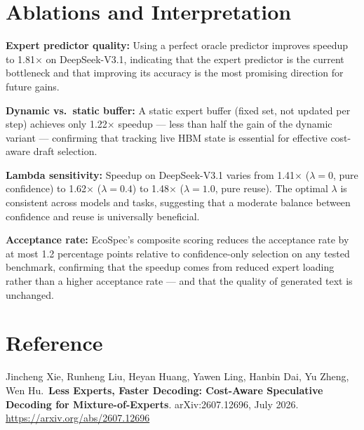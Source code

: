 \documentclass[10pt,twocolumn]{article}
\begin{document}
\section{Ablations and Interpretation}

\textbf{Expert predictor quality:} Using a perfect oracle predictor
improves speedup to 1.81$\times$ on DeepSeek-V3.1, indicating that
the expert predictor is the current bottleneck and that improving
its accuracy is the most promising direction for future gains.

\textbf{Dynamic vs.\ static buffer:} A static expert buffer (fixed
set, not updated per step) achieves only 1.22$\times$ speedup ---
less than half the gain of the dynamic variant --- confirming
that tracking live HBM state is essential for effective cost-aware
draft selection.

\textbf{Lambda sensitivity:} Speedup on DeepSeek-V3.1 varies from
1.41$\times$ ($\lambda = 0$, pure confidence) to 1.62$\times$
($\lambda = 0.4$) to 1.48$\times$ ($\lambda = 1.0$, pure reuse).
The optimal $\lambda$ is consistent across models and tasks,
suggesting that a moderate balance between confidence and
reuse is universally beneficial.

\textbf{Acceptance rate:} EcoSpec's composite scoring reduces the
acceptance rate by at most 1.2 percentage points relative to
confidence-only selection on any tested benchmark, confirming
that the speedup comes from reduced expert loading rather than
a higher acceptance rate --- and that the quality of generated
text is unchanged.

\section*{Reference}

Jincheng Xie, Runheng Liu, Heyan Huang, Yawen Ling,
Hanbin Dai, Yu Zheng, Wen Hu.\
\textbf{Less Experts, Faster Decoding: Cost-Aware Speculative
Decoding for Mixture-of-Experts}.
arXiv:2607.12696, July 2026.
\url{https://arxiv.org/abs/2607.12696}
\end{document}
